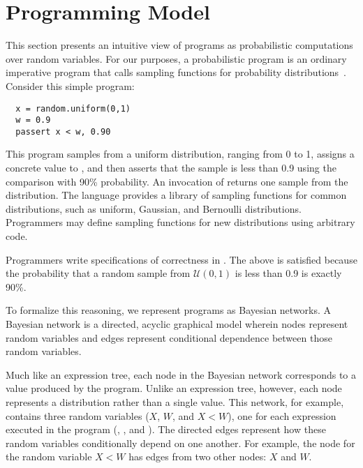 \section{Programming Model}
\label{passert:sec:model}
 
This section presents an intuitive view of programs as probabilistic
computations over random variables.
For our purposes, a probabilistic program is an ordinary imperative program
that calls sampling functions for probability distributions~\cite{kozen}.
Consider this simple program:
%
\begin{lstlisting}
  x = random.uniform(0,1)
  w = 0.9
  passert x < w, 0.90
\end{lstlisting}
%
This program samples from a uniform distribution, ranging from 0 to 1,
assigns a concrete value to , and then asserts that the sample is
less than 0.9 using the comparison  with 90\% probability.
An invocation
of  returns one sample from the distribution.
The language provides a library of sampling functions for common distributions, such as uniform, Gaussian,
and Bernoulli distributions. Programmers may define sampling functions for new distributions using
arbitrary code.

Programmers write specifications of correctness in \passerts. The above \passert is
satisfied because the probability that a random sample from 
$\mathcal{U}(0,1)$ is less than 0.9 is exactly 90\%.

To formalize this reasoning, we represent programs as Bayesian networks.
A Bayesian network is
a directed, acyclic graphical model wherein nodes represent random variables and
edges represent conditional dependence between those
random variables.
%
\begin{center}
{\scriptsize
{}
}
\end{center}
%
Much like an expression tree, each node in the Bayesian network corresponds to a value produced by the program.  Unlike an expression tree, however, each node represents a distribution rather than a single value.
This network, for example,
contains three random variables ($X$, $W$, and $X<W$), one for each
expression executed in the program (, ,
and ). The directed edges represent how these
random variables conditionally depend on one another. For example,
the node for the random variable $X
< W$ has edges from two other nodes: $X$ and $W$.

